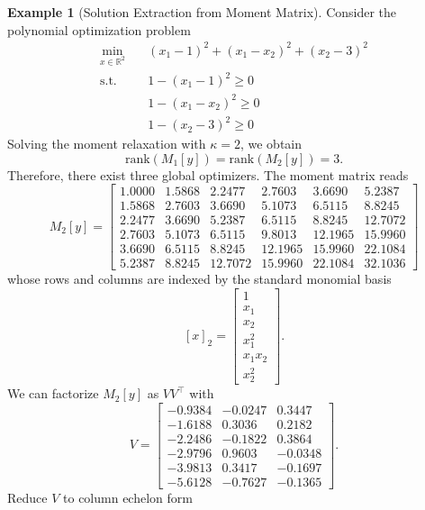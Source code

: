 \documentclass[
]{book}
\theoremstyle{definition}
\theoremstyle{definition}
\newtheorem{example}{Example}[chapter]
\theoremstyle{definition}
\theoremstyle{definition}
\theoremstyle{remark}
\begin{document}
\begin{example}[Solution Extraction from Moment Matrix]
\protect\hypertarget{exm:SolutionExtraction}{}\label{exm:SolutionExtraction}Consider the polynomial optimization problem
\begin{equation}
\begin{split}
\min_{x \in \mathbb{R}^{2}} & \quad (x_1 - 1)^2 + (x_1 - x_2)^2 + (x_2 - 3)^2 \\
\mathrm{s.t.}& \quad 1 - (x_1 - 1)^2 \geq 0 \\
& \quad 1 - (x_1 - x_2)^2 \geq 0 \\
& \quad 1 - (x_2 - 3)^2 \geq 0
\end{split}
\end{equation}
Solving the moment relaxation with \(\kappa =2\), we obtain
\[
\mathrm{rank}(M_1[y]) = \mathrm{rank}(M_2[y]) = 3.
\]
Therefore, there exist three global optimizers. The moment matrix reads
\[
M_2[y] = \begin{bmatrix}
1.0000 & 1.5868 & 2.2477 & 2.7603 & 3.6690 & 5.2387 \\
1.5868 & 2.7603 & 3.6690 & 5.1073 & 6.5115 & 8.8245 \\
2.2477 & 3.6690 & 5.2387 & 6.5115 & 8.8245 & 12.7072 \\
2.7603 & 5.1073 & 6.5115 & 9.8013 & 12.1965 & 15.9960 \\
3.6690 & 6.5115 & 8.8245 & 12.1965 & 15.9960 & 22.1084 \\
5.2387 & 8.8245 & 12.7072 & 15.9960 & 22.1084 & 32.1036
\end{bmatrix}
\]
whose rows and columns are indexed by the standard monomial basis
\[
[x]_2 = \begin{bmatrix}
1 \\ x_1 \\ x_2 \\ x_1^2 \\ x_1 x_2 \\ x_2^2 
\end{bmatrix}.
\]
We can factorize \(M_2[y]\) as \(VV^\top\) with
\[
V = \begin{bmatrix}
-0.9384 & - 0.0247 & 0.3447 \\
-1.6188 & 0.3036 & 0.2182 \\
-2.2486 & -0.1822 & 0.3864 \\
-2.9796 & 0.9603 & -0.0348 \\
-3.9813 & 0.3417 & -0.1697 \\
-5.6128 & -0.7627 & -0.1365
\end{bmatrix}.
\]
Reduce \(V\) to column echelon form

\end{example}
\end{document}
